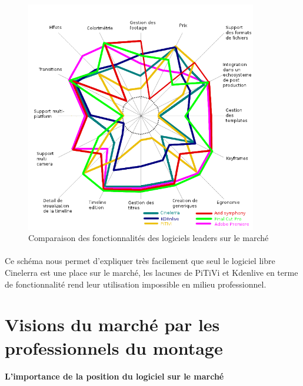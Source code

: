 \begin{figure} [H]

  \begin{center}

    \includegraphics[width=0.9\textwidth]{images/spiderDiagramFeaturesComparision}

  \end{center}

  \caption{Comparaison des fonctionnalités des logiciels leaders sur
  le marché}

  \label{Yes}

\end{figure}

\paragraph {}

Ce schéma nous permet d'expliquer très facilement que seul le logiciel
libre Cinelerra est une place sur le marché, les lacunes de PiTiVi et
Kdenlive en terme de fonctionnalité rend leur utilisation impossible
en milieu professionnel.

\newpage

\section{Visions du marché par les professionnels du montage}

\paragraph{L'importance de la position du logiciel sur le marché}

